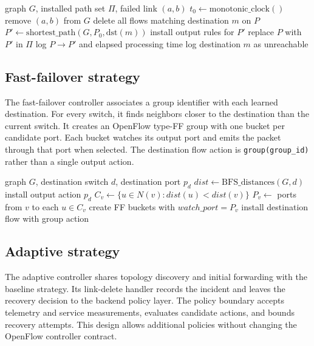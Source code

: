 \documentclass[conference]{IEEEtran}
\begin{document}
\begin{algorithm}
\caption{Reactive link-failure recovery}
\label{alg:reactive}
\begin{algorithmic}[1]
\Require graph $G$, installed path set $\Pi$, failed link $(a,b)$
\State $t_0\gets\mathrm{monotonic\_clock}()$
\State remove $(a,b)$ from $G$
  \State delete all flows matching destination $m$ on $P$
  \State $P'\gets\mathrm{shortest\_path}(G,P_0,\mathrm{dst}(m))$
    \State install output rules for $P'$
    \State replace $P$ with $P'$ in $\Pi$
    \State log $P\rightarrow P'$ and elapsed processing time
  \Else
    \State log destination $m$ as unreachable
  \EndIf
\EndFor
\end{algorithmic}
\end{algorithm}

\subsection{Fast-failover strategy}

The fast-failover controller associates a group identifier with each learned
destination. For every switch, it finds neighbors closer to the destination
than the current switch. It creates an OpenFlow type-FF group with one bucket
per candidate port. Each bucket watches its output port and emits the packet
through that port when selected. The destination flow action is
\texttt{group(group\_id)} rather than a single output action.

\begin{algorithm}
\caption{Fast-failover group installation}
\label{alg:ff}
\begin{algorithmic}[1]
\Require graph $G$, destination switch $d$, destination port $p_d$
\State $dist\gets\mathrm{BFS\_distances}(G,d)$
    \State install output action $p_d$
  \Else
    \State $C_v\gets\{u\in N(v):dist(u)<dist(v)\}$
    \State $P_v\gets$ ports from $v$ to each $u\in C_v$
    \State create FF buckets with $watch\_port=P_v$
    \State install destination flow with group action
  \EndIf
\EndFor
\end{algorithmic}
\end{algorithm}

\subsection{Adaptive strategy}

The adaptive controller shares topology discovery and initial forwarding with
the baseline strategy. Its link-delete handler records the incident and leaves
the recovery decision to the backend policy layer. The policy boundary accepts
telemetry and service measurements, evaluates candidate actions, and bounds
recovery attempts. This design allows additional policies without changing
the OpenFlow controller contract.
\end{document}
